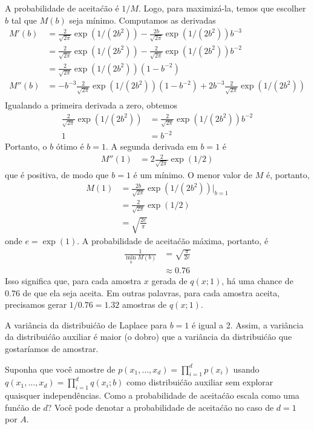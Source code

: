 \begin{exenumerate}
    \begin{solution}
        A probabilidade de aceita\'c\~ao \'e $1/M$. Logo, para maximiz\'a-la,
        temos que escolher $b$ tal que $M(b)$ seja m\'inimo. Computamos as derivadas
        \begin{align}
            M'(b) & = \frac{2}{\sqrt{2\pi}} \exp(1/(2b^2)) - \frac{2b}{\sqrt{2\pi}} \exp(1/(2b^2)) b^{-3}\\
            & = \frac{2}{\sqrt{2\pi}} \exp(1/(2b^2)) - \frac{2}{\sqrt{2\pi}} \exp(1/(2b^2)) b^{-2}\\
            & = \frac{2}{\sqrt{2\pi}} \exp(1/(2b^2))(1-b^{-2})\\
            M''(b) & = -b^{-3}\frac{2}{\sqrt{2\pi}} \exp(1/(2b^2))(1-b^{-2})+2b^{-3}\frac{2}{\sqrt{2\pi}} \exp(1/(2b^2))\\
        \end{align}
        Igualando a primeira derivada a zero, obtemos
        \begin{align}
            \frac{2}{\sqrt{2\pi}} \exp(1/(2b^2)) &= \frac{2}{\sqrt{2\pi}} \exp(1/(2b^2)) b^{-2}\\
            1 & = b^{-2}
        \end{align}
        Portanto, o $b$ \'otimo \'e $b=1$. A segunda derivada em $b=1$ \'e
        \begin{align}
            M''(1) & = 2 \frac{2}{\sqrt{2\pi}} \exp(1/2)
        \end{align}
        que \'e positiva, de modo que $b=1$ \'e um m\'inimo. O menor valor de $M$ \'e, portanto,
        \begin{align}
            M(1) & =  \frac{2b}{\sqrt{2\pi}} \exp(1/(2b^2))\Big |_{b=1} \\
            & =  \frac{2}{\sqrt{2\pi}} \exp(1/2)\\
            & =  \sqrt{\frac{2 e}{\pi}}
        \end{align}
        onde $e = \exp(1)$. A probabilidade de aceita\'c\~ao m\'axima, portanto, \'e
        \begin{align}
            \frac{1}{\min_b M(b)} & = \sqrt{\frac{\pi}{2e}}\\
            & \approx 0.76
        \end{align}
        Isso significa que, para cada amostra $x$ gerada de $q(x; 1)$, h\'a
        uma chance de $0.76$ de que ela seja aceita. Em outras palavras, para cada
        amostra aceita, precisamos gerar $1/0.76 = 1.32$ amostras de
        $q(x; 1)$.
        
        A vari\^ancia da distribui\'c\~ao de Laplace para $b=1$ \'e igual a 2. Assim,
        a vari\^ancia da distribui\'c\~ao auxiliar \'e maior (o dobro)
        que a vari\^ancia da distribui\'c\~ao que gostar\'iamos de amostrar. 
    \end{solution}
    \item Suponha que voc\^e amostre de $p(x_1, \ldots, x_d) = \prod_{i=1}^d
    p(x_i)$ usando $q(x_1, \ldots, x_d) = \prod_{i=1}^d q(x_i; b)$ como
    distribui\'c\~ao auxiliar sem explorar quaisquer independ\^encias. Como
    a probabilidade de aceita\'c\~ao escala como uma fun\'c\~ao de $d$? Voc\^e pode
    denotar a probabilidade de aceita\'c\~ao no caso de $d=1$ por $A$.
    

\end{exenumerate}
